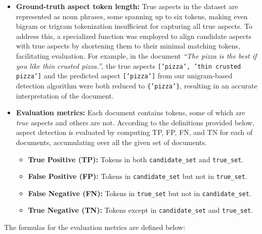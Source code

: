 \begin{itemize}
    \item \textbf{Ground-truth aspect token length:} True aspects in the dataset are represented as noun phrases, some spanning up to six tokens, making even bigram or trigram tokenization insufficient for capturing all true aspects. To address this, a specialized function was employed to align candidate aspects with true aspects by shortening them to their minimal matching tokens, facilitating evaluation. For example, in the document \textit{``The pizza is the best if you like thin crusted pizza.''}, the true aspects \texttt{['pizza', 'thin crusted pizza']} and the predicted aspect \texttt{['pizza']} from our unigram-based detection algorithm were both reduced to \texttt{\{'pizza'\}}, resulting in an accurate interpretation of the document.

    \item \textbf{Evaluation metrics:} Each document contains tokens, some of which are \textit{true} aspects and others are not. According to the definitions provided below, aspect detection is evaluated by computing TP, FP, FN, and TN for each of documents, accumulating over all the given set of documents.
    \begin{itemize}
        \item \textbf{True Positive (TP):} Tokens in both \texttt{candidate\_set} and \texttt{true\_set}.
        
        \item \textbf{False Positive (FP):} Tokens in \texttt{candidate\_set} but not in \texttt{true\_set}.
        
        \item \textbf{False Negative (FN):} Tokens in \texttt{true\_set} but not in \texttt{candidate\_set}.
        
        \item \textbf{True Negative (TN):} Tokens except in \texttt{candidate\_set} and \texttt{true\_set}.
    \end{itemize}
\end{itemize}

The formulas for the evaluation metrics are defined below:


